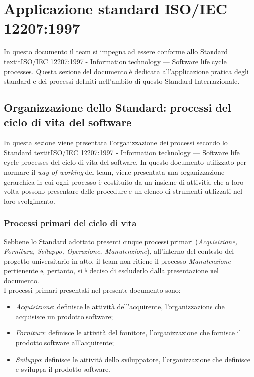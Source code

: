 \documentclass[10pt, a4paper]{article}
\begin{document}
\section{Applicazione standard ISO/IEC 12207:1997}
In questo documento il team si impegna ad essere conforme allo Standard textit{ISO/IEC 12207:1997 - Information technology — Software 
life cycle processes}. Questa sezione del documento è dedicata all'applicazione pratica degli standard e dei processi definiti 
nell'ambito di questo Standard Internazionale.

\subsection{Organizzazione dello Standard: processi del ciclo di vita del software}
In questa sezione viene presentata l'organizzazione dei processi secondo lo Standard textit{ISO/IEC 12207:1997 - Information technology 
— Software life cycle processes} del ciclo di vita del software. In questo documento utilizzato per normare il \textit{way of working} 
del team, viene presentata una organizzazione gerarchica in cui ogni processo è costituito da un insieme di attività, che a 
loro volta possono presentare delle procedure e un elenco di strumenti utilizzati nel loro svolgimento.

\subsubsection{Processi primari del ciclo di vita}
Sebbene lo Standard adottato presenti cinque processi primari (\textit{Acquisizione, Fornitura, Sviluppo, Operazione, Manutenzione}),
all'interno del contesto del progetto universitario in atto, il team non ritiene il processo \textit{Manutenzione} pertienente e, pertanto, 
si è deciso di escluderlo dalla presentazione nel documento.\\
I processi primari presentati nel presente documento sono:
\begin{itemize}
    \item \textit{Acquisizione}: definisce le attività dell'acquirente, l'organizzazione che acquisisce un prodotto software;
    \item \textit{Fornitura}: definisce le attività del fornitore, l'organizzazione che fornisce il prodotto software all'acquirente;
    \item \textit{Sviluppo}: definisce le attività dello sviluppatore, l'organizzazione che definisce e sviluppa il prodotto software.
\end{itemize}
\end{document}
